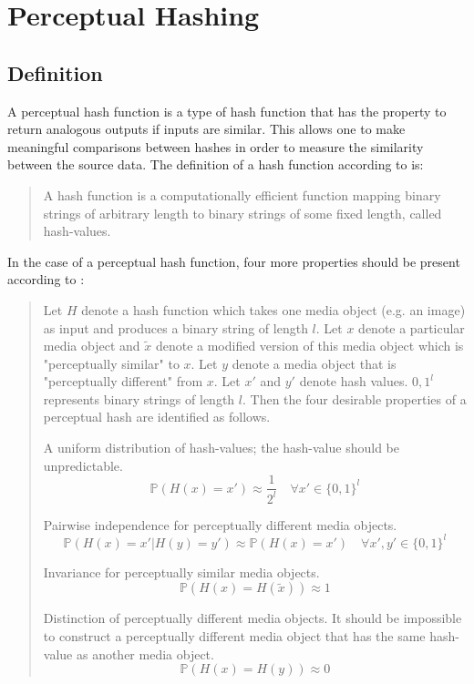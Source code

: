 \chapter{Perceptual Hashing}

\label{chapter:PerceptualHashing}


\section{Definition}
A perceptual hash function is a type of hash function that has the property to return analogous outputs if inputs are similar. This allows one to make meaningful comparisons between hashes in order to measure the similarity between the source data. The definition of a hash function according to \cite{menezes1996handbook} is: 

\begin{quote}
A hash function is a computationally efficient function mapping binary strings of arbitrary length to binary strings of some fixed length, called hash-values.
\end{quote}

In the case of a perceptual hash function, four more properties should be present according to \cite{zauner2010implementation}:

\begin{quote}
Let $H$ denote a hash function which takes one media object (e.g. an image) as input and produces a binary string of length $l$. Let $x$ denote a particular media object and $\widetilde{x}$ denote a modified version of this media object which is "perceptually similar" to $x$. Let $y$ denote a media object that is "perceptually different" from $x$. Let $x'$ and $y'$ denote hash values. ${0,1}^l$ represents binary strings of length $l$. Then the four desirable properties of a perceptual hash are identified as follows.

A uniform distribution of hash-values; the hash-value should be unpredictable.
\[\mathbb{P}(H(x)=x') \approx \frac{1}{2^l}  \quad  \forall x' \in \{0, 1\}^l\]

Pairwise independence for perceptually different media objects.
\[\mathbb{P}(H(x)=x' | H(y)=y') \approx \mathbb{P}(H(x)=x') \quad \forall x', y' \in \{0, 1\}^l\]

Invariance for perceptually similar media objects.
\[\mathbb{P}(H(x)=H(\widetilde{x})) \approx 1\]

Distinction of perceptually different media objects. It should be impossible to construct a perceptually different media object that has the same hash-value as another media object.
\[\mathbb{P}(H(x)=H(y)) \approx 0\]

\end{quote}

